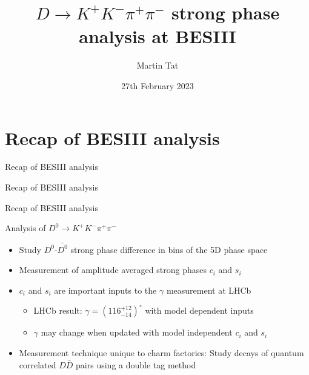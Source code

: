 \documentclass{beamer}
\title[$K^+K^-\pi^+\pi^-$]{\texorpdfstring{$D\to K^+K^-\pi^+\pi^-$}{K+K-pi+pi-} strong phase analysis at BESIII}
\author{Martin Tat}
\institute{Oxford LHCb}
\date{27th February 2023}
\begin{document}
\begin{frame}
  \titlepage
\end{frame}


\section{Recap of BESIII analysis}
\begin{frame}{Recap of BESIII analysis}
  \begin{center}
    {\huge Recap of BESIII analysis}
  \end{center}
\end{frame}

\begin{frame}{Recap of BESIII analysis}
  \begin{center}
    \Large{Analysis of $D^0\to K^+K^-\pi^+\pi^-$}
  \end{center}
  \vspace{0.5cm}
  \begin{itemize}
    \setlength\itemsep{1.0em}
    \item{Study $D^0$-$\bar{D^0}$ strong phase difference in bins of the 5D phase space}
    \item{Measurement of amplitude averaged strong phases $c_i$ and $s_i$}
    \item{$c_i$ and $s_i$ are important inputs to the $\gamma$ measurement at LHCb}
    \begin{itemize}
      \item{LHCb result: $\gamma = (116^{+12}_{-14})^\circ$ with model dependent inputs}
      \item{$\gamma$ may change when updated with model independent $c_i$ and $s_i$}
    \end{itemize}
    \item{Measurement technique unique to charm factories: Study decays of quantum correlated $D\bar{D}$ pairs using a double tag method}
  \end{itemize}
\end{frame}
\end{document}
